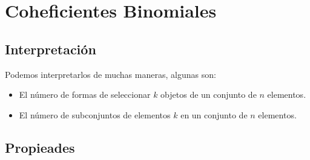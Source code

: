\documentclass[12pt, fleqn]{report}                             %
\theoremstyle{break}                                            %
\begin{document}
        \clearpage
        \section{Coheficientes Binomiales}

            \subsection{Interpretación}

                Podemos interpretarlos de muchas maneras, algunas son:
                \begin{itemize}
                    \item
                        El número de formas de seleccionar $k$ objetos de un conjunto de $n$ elementos.
                    \item
                        El número de subconjuntos de elementos $k$ en un conjunto de $n$ elementos.
                \end{itemize}


            \subsection{Propieades}
\end{document}
